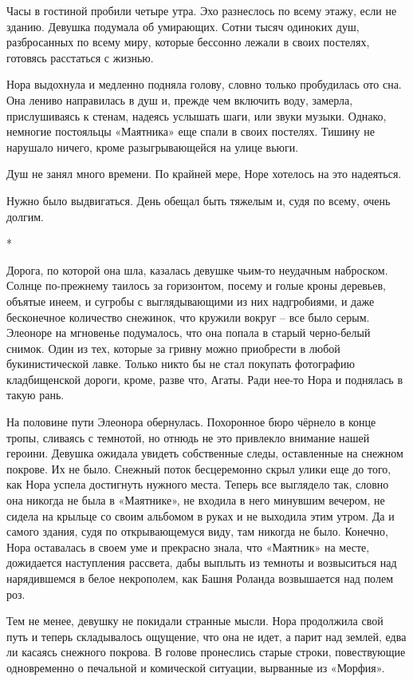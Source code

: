 \documentclass[
  a5paperpaper,
  DIV=11,
  numbers=noendperiod]{scrreprt}
\begin{document}
Часы в гостиной пробили четыре утра. Эхо разнеслось по всему этажу, если
не зданию. Девушка подумала об умирающих. Сотни тысяч одиноких душ,
разбросанных по всему миру, которые бессонно лежали в своих постелях,
готовясь расстаться с жизнью.

Нора выдохнула и медленно подняла голову, словно только пробудилась ото
сна. Она лениво направилась в душ и, прежде чем включить воду, замерла,
прислушиваясь к стенам, надеясь услышать шаги, или звуки музыки. Однако,
немногие постояльцы «Маятника» еще спали в своих постелях. Тишину не
нарушало ничего, кроме разыгрывающейся на улице вьюги.

Душ не занял много времени. По крайней мере, Норе хотелось на это
надеяться.

Нужно было выдвигаться. День обещал быть тяжелым и, судя по всему, очень
долгим.

*

Дорога, по которой она шла, казалась девушке чьим-то неудачным
наброском. Солнце по-прежнему таилось за горизонтом, посему и голые
кроны деревьев, объятые инеем, и сугробы с выглядывающими из них
надгробиями, и даже бесконечное количество снежинок, что кружили вокруг
-- все было серым. Элеоноре на мгновенье подумалось, что она попала в
старый черно-белый снимок. Один из тех, которые за гривну можно
приобрести в любой букинистической лавке. Только никто бы не стал
покупать фотографию кладбищенской дороги, кроме, разве что, Агаты. Ради
нее-то Нора и поднялась в такую рань.

На половине пути Элеонора обернулась. Похоронное бюро чёрнело в конце
тропы, сливаясь с темнотой, но отнюдь не это привлекло внимание нашей
героини. Девушка ожидала увидеть собственные следы, оставленные на
снежном покрове. Их не было. Снежный поток бесцеремонно скрыл улики еще
до того, как Нора успела достигнуть нужного места. Теперь все выглядело
так, словно она никогда не была в «Маятнике», не входила в него минувшим
вечером, не сидела на крыльце со своим альбомом в руках и не выходила
этим утром. Да и самого здания, судя по открывающемуся виду, там никогда
не было. Конечно, Нора оставалась в своем уме и прекрасно знала, что
«Маятник» на месте, дожидается наступления рассвета, дабы выплыть из
темноты и возвыситься над нарядившемся в белое некрополем, как Башня
Роланда возвышается над полем роз.

Тем не менее, девушку не покидали странные мысли. Нора продолжила свой
путь и теперь складывалось ощущение, что она не идет, а парит над
землей, едва ли касаясь снежного покрова. В голове пронеслись старые
строки, повествующие одновременно о печальной и комической ситуации,
вырванные из «Морфия».
\end{document}

